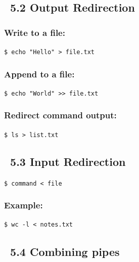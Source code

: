 \documentclass[12pt]{article}
\newcommand{\outputicon}{\faArrowRight}
\newcommand{\inputicon}{\faArrowLeft}
\newcommand{\chainicon}{\faLink}
\begin{document}
\subsection*{\outputicon\ 5.2 Output Redirection}

\subsubsection*{Write to a file:}

\begin{highlightbox}
\texttt{\$ echo "Hello" > file.txt}
\end{highlightbox}

\subsubsection*{Append to a file:}

\begin{highlightbox}
\texttt{\$ echo "World" >> file.txt}
\end{highlightbox}

\subsubsection*{Redirect command output:}

\begin{highlightbox}
\texttt{\$ ls > list.txt}
\end{highlightbox}

\subsection*{\inputicon\ 5.3 Input Redirection}

\begin{highlightbox}
\texttt{\$ command < file}
\end{highlightbox}

\subsubsection*{Example:}

\begin{highlightbox}
\texttt{\$ wc -l < notes.txt}
\end{highlightbox}

\subsection*{\chainicon\ 5.4 Combining pipes}
\end{document}
